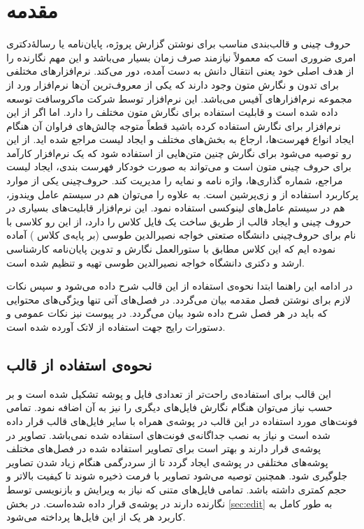 
\chapter{مقدمه}
حروف چینی و قالب‌بندی مناسب برای نوشتن گزارش پروژه، پایان‌نامه یا رسالهٔ‌دکتری امری ضروری است که معمولاً نیازمند صرف زمان بسیار می‌باشد و این مهم نگارنده را از هدف اصلی خود یعنی انتقال دانش به دست آمده، دور می‌کند. نرم‌افزارهای مختلفی برای تدون و نگارش متون وجود دارند که یکی از معروف‌ترین آن‌ها نرم‌افزار ورد%
از مجموعه نرم‌افزار‌های آفیس می‌باشد. این نرم‌افزار توسط شرکت ماکروسافت توسعه داده شده است و قابلیت استفاده برای نگارش متون مختلف را دارد. اما اگر از این نرم‌افزار برای نگارش \پ استفاده کرده باشید قطعاً متوجه چالش‌های فراوان آن هنگام ایجاد انواع فهرست‌ها، ارجاع به بخش‌های مختلف و ایجاد لیست مراجع شده اید. از این رو توصیه می‌شود برای نگارش چنین متن‌هایی از 
\lr{\LaTeX}
استفاده شود که یک نرم‌افزار کارآمد برای حروف چینی متون است و می‌تواند به صورت خودکار فهرست بندی، ایجاد لیست مراجع، شماره گذاری‌ها، واژه نامه و نمایه را مدیریت کند. حروف‌چینی \پ یکی از موارد پرکاربرد استفاده از
\lr{\LaTeX}
و زی‌پرشین
\cite{Khalighi87xepersian}
است. به علاوه
\lr{\LaTeX}
را می‌توان هم در سیستم عامل ویندوز، هم در سیستم عامل‌های لینوکسی استفاده نمود. این نرم‌افزار قابلیت‌های بسیاری در حروف چینی و ایجاد قالب از طریق ساخت یک فایل کلاس را دارد، از این رو  کلاسی با نام 
برای حروف‌چینی \پ دانشگاه صتعتی خواجه نصیرالدین طوسی (بر پایه‌ی کلاس
) آماده نموده ایم که این کلاس مطابق با ستورالعمل نگارش و تدوین پایان‌نامه کارشناسی ارشد و دکتری دانشگاه خواجه نصیرالدین طوسی
\cite{KNTUThesisGuide}
تهیه و تنظیم شده است. 

در ادامه این راهنما ابتدا نحوه‌ی استفاده از این قالب شرح داده می‌شود و سپس نکات لازم برای نوشتن فصل مقدمه بیان می‌گردد. در فصل‌های آتی تنها ویژگی‌های محتوایی که باید در هر فصل شرح داده شود بیان می‌گردد. در پیوست نیز نکات عمومی و دستورات رایج جهت استفاده از لاتک آورده شده است.

\section{نحوه‌ی استفاده از قالب}
این قالب برای استفاده‌ی راحت‌تر از تعدادی فایل و پوشه تشکیل شده است و بر حسب نیاز می‌توان هنگام نگارش
فایل‌های دیگری را نیز به آن اضافه نمود. تمامی فونت‌های مورد استفاده در این قالب در پوشه‌ی 
همراه با سایر فایل‌های قالب قرار داده شده است و نیاز به نصب جداگانه‌ی فونت‌های استفاده شده نمی‌باشد.
تصاویر در پوشه‌ی 
قرار دارند و بهتر است برای تصاویر استفاده ‌شده در فصل‌های مختلف پوشه‌های مختلفی در پوشه‌ی
ایجاد گردد تا از سردرگمی ‌هنگام زیاد شدن تصاویر جلوگیری شود. همچنین توصیه می‌شود تصاویر با فرمت
ذخیره شوند تا کیفیت بالاتر و حجم کمتری داشته باشد.
تمامی فایل‌های متنی که نیاز به ویرایش و بازنویسی توسط نگارنده \پ دارند در پوشه‌ی
قرار داده شده‌است. در بخش
\ref{sec:edit}
به طور کامل به کاربرد هر یک از این فایل‌ها پرداخته می‌شود.


